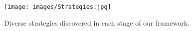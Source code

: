 \begin{figure}
    \centering
    \texttt{[image: images/Strategies.jpg]}
    \caption{Diverse strategies discovered in each stage of our framework.}
\label{fig:strategies}
\end{figure}
